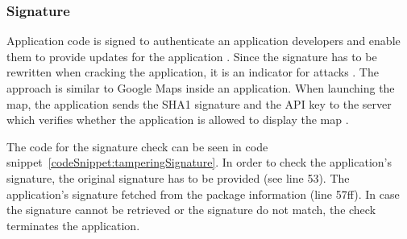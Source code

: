 \subsubsection{Signature} \label{subsection:counter-improve-tampering-signature}
Application code is signed to authenticate an application developers and enable them to provide updates for the application \cite{androidSigning}.
Since the signature has to be rewritten when cracking the application, it is an indicator for attacks \cite{tamperSignature}.
\newline
The approach is similar to Google Maps inside an application.
When launching the map, the application sends the SHA1 signature and the API key to the server which verifies whether the application is allowed to display the map \cite{maps}.
\newline

The code for the signature check can be seen in code snippet~\ref{codeSnippet:tamperingSignature}.
In order to check the application's signature, the original signature has to be provided (see line 53).
The application's signature fetched from the package information (line 57ff).
In case the signature cannot be retrieved or the signature do not match, the check terminates the application.
